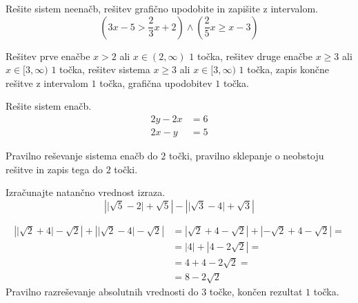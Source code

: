 \documentclass[addpoints]{exam}
\begin{document}
\begin{questions}
        

    \newpage
    \question[5]
    Rešite sistem neenačb, rešitev grafično upodobite in zapišite z intervalom.
    $$ \left(3x-5>\frac{2}{3}x+2\right)\land\left(\frac{2}{5}x\geq x-3\right) $$
    
    
    \begin{solution}[12cm]
        Rešitev prve enačbe $x>2$ ali $x\in(2,\infty)$ $1$ točka, rešitev druge enačbe $x\geq 3$ ali $x\in[3,\infty)$ $1$ točka, rešitev sistema $x\geq 3$ ali $x\in[3,\infty)$ $1$ točka, zapis končne rešitve z intervalom $1$ točka, grafična upodobitev $1$ točka.
    \end{solution}


    


    \question[4]
    Rešite sistem enačb.
    $$ \begin{aligned}
        2y-2x&=6 \\ 2x-y&=5
    \end{aligned} $$
    
    
    \begin{solution}[6cm]
        Pravilno reševanje sistema enačb do $2$ točki, pravilno sklepanje o neobstoju rešitve in zapis tega do $2$ točki.
    \end{solution}



    
    




    \newpage 

    
    \question[5]
    Izračunajte natančno vrednost izraza.
    $$ \left\lvert \lvert\sqrt{5}-2\rvert+\sqrt{5}\right\rvert - \left\lvert \lvert\sqrt{3}-4\rvert+\sqrt{3}\right\rvert $$
    
    
    
    \begin{solution}[11cm]
        \begin{align*}
            \left\lvert \lvert\sqrt{2}+4\rvert-\sqrt{2}\right\rvert + \left\lvert \lvert\sqrt{2}-4\rvert-\sqrt{2}\right\rvert &=
            \left\lvert \sqrt{2}+4-\sqrt{2}\right\rvert + \left\lvert -\sqrt{2}+4-\sqrt{2}\right\rvert= \\
            &= \left\lvert 4\right\rvert + \left\lvert 4-2\sqrt{2}\right\rvert= \\
            &= 4+4-2\sqrt{2}= \\
            &= 8-2\sqrt{2}
        \end{align*}
        Pravilno razreševanje absolutnih vrednosti do $3$ točke, končen rezultat $1$ točka.
    \end{solution}





\end{questions}
\end{document}
